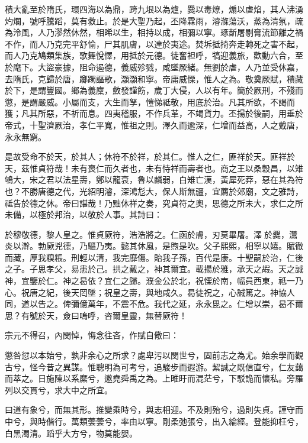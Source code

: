 \begin{pinyinscope}
 積大亂至於隋氏，環四海以為鼎，跨九垠以為爐，爨以毒燎，煽以虐焰，其人沸湧灼爛，號呼騰蹈，莫有救止。於是大聖乃起，丕降霖雨，濬滌蕩沃，蒸為清氛，疏為泠風，人乃漻然休然，相晞以生，相持以成，相彌以寧。琢斮屠剔膏流節離之禍不作，而人乃克完平舒愉，尸其肌膚，以達於夷途。焚坼抵掎奔走轉死之害不起，而人乃克鳩類集族，歌舞悅懌，用抵於元德。徒奮袒呼，犒迎義旅，歡動六合，至於麾下。大盜豪據，阻命遏德，義威殄戮，咸墜厥緒。無劉於虐，人乃並受休嘉，去隋氏，克歸於唐，躑躅謳歌，灝灝和寧。帝庸威慄，惟人之為。敬奠厥賦，積藏於下，是謂豐國。鄉為義廩，斂發謹飭，歲丁大侵，人以有年。簡於厥刑，不殘而懲，是謂嚴威。小屬而支，大生而孥，愷悌祗敬，用底於治。凡其所欲，不謁而獲；凡其所惡，不祈而息。四夷稽服，不作兵革，不竭貨力。丕揚於後嗣，用垂於帝式，十聖濟厥治，孝仁平寬，惟祖之則。澤久而逾深，仁增而益高，人之戴唐，永永無窮。



 是故受命不於天，於其人；休符不於祥，於其仁。惟人之仁，匪祥於天。匪祥於天，茲惟貞符哉！未有喪仁而久者也，未有恃祥而壽者也。商之王以桑穀昌，以雉鴝大，宋之君以法星壽，鄭以龍衰，魯以麟弱，白雉亡漢，黃犀死莽，惡在其為符也？不勝唐德之代，光紹明濬，深鴻尨大，保人斯無疆，宜薦於郊廟，文之雅詩，祗告於德之休。帝曰諶哉！乃黜休祥之奏，究貞符之奧，思德之所未大，求仁之所未備，以極於邦治，以敬於人事。其詩曰：



 於穆敬德，黎人皇之。惟貞厥符，浩浩將之。仁函於膚，刃莫畢屠。澤於爨，灊炎以澣。勃厥兇德，乃驅乃夷。懿其休風，是煦是吹。父子熙熙，相寧以嬉。賦徹而藏，厚我糗粻。刑輕以清，我完靡傷。貽我子孫，百代是康。十聖嗣於治，仁後之子。子思孝父，易患於己。拱之戴之，神其爾宜。載揚於雅，承天之嘏。天之誠神，宜鑒於仁。神之曷依？宜仁之歸。濮金公於北，祝慄於南，幅員西東，祗一乃心。祝唐之紀，後天罔墜；祝皇之壽，與地咸久。曷徒祝之，心誠篤之。神協人同，道以告之。俾彌億萬年，不震不危。我代之延，永永毘之。仁增以崇，曷不爾思？有號於天，僉曰嗚呼，咨爾皇靈，無替厥符！



 宗元不得召，內閔悼，悔念往吝，作賦自儆曰：



 懲咎愆以本始兮，孰非余心之所求？處卑污以閔世兮，固前志之為尤。始余學而觀古兮，怪今昔之異謀。惟聰明為可考兮，追駿步而遐游。絜誠之既信直兮，仁友藹而萃之。日施陳以系縻兮，邀堯舜禹之為。上睢盱而混茫兮，下駁詭而懷私。旁羅列以交貫兮，求大中之所宜。



 曰道有象兮，而無其形。推變乘時兮，與志相迎。不及則殆兮，過則失貞。謹守而中兮，與時偕行。萬類蕓蕓兮，率由以寧。剛柔弛張兮，出入綸經。登能抑枉兮，白黑濁清。蹈乎大方兮，物莫能嬰。




\end{pinyinscope}
